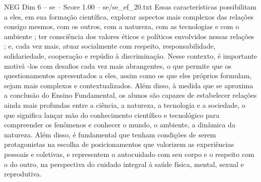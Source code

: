 \begin{textsample}{NEG Dim 6 – se – Score 1.00 – se/se\_ef\_20.txt}
Essas características possibilitam a eles, em sua formação científica, explorar aspectos mais complexos das relações consigo mesmos, com os outros, com a natureza, com as tecnologias e com o ambiente ; ter consciência dos valores éticos e políticos envolvidos nessas relações ; e, cada vez mais, atuar socialmente com respeito, responsabilidade, solidariedade, cooperação e repúdio à discriminação.
Nesse contexto, é importante motivá -los com desafios cada vez mais abrangentes, o que permite que os questionamentos apresentados a eles, assim como os que eles próprios formulam, sejam mais complexos e contextualizados.
Além disso, à medida que se aproxima a conclusão do Ensino Fundamental, os alunos são capazes de estabelecer relações ainda mais profundas entre a ciência, a natureza, a tecnologia e a sociedade, o que significa lançar mão do conhecimento científico e tecnológico para compreender os fenômenos e conhecer o mundo, o ambiente, a dinâmica da natureza.
Além disso, é fundamental que tenham condições de serem protagonistas na escolha de posicionamentos que valorizem as experiências pessoais e coletivas, e representem o autocuidado com seu corpo e o respeito com o do outro, na perspectiva do cuidado integral à saúde física, mental, sexual e reprodutiva.

\end{textsample}
